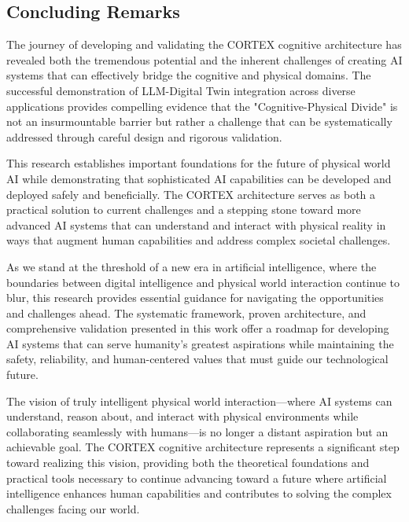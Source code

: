 \subsection{Concluding Remarks}

The journey of developing and validating the CORTEX cognitive architecture has revealed both the tremendous potential and the inherent challenges of creating AI systems that can effectively bridge the cognitive and physical domains. The successful demonstration of LLM-Digital Twin integration across diverse applications provides compelling evidence that the "Cognitive-Physical Divide" is not an insurmountable barrier but rather a challenge that can be systematically addressed through careful design and rigorous validation.

This research establishes important foundations for the future of physical world AI while demonstrating that sophisticated AI capabilities can be developed and deployed safely and beneficially. The CORTEX architecture serves as both a practical solution to current challenges and a stepping stone toward more advanced AI systems that can understand and interact with physical reality in ways that augment human capabilities and address complex societal challenges.

As we stand at the threshold of a new era in artificial intelligence, where the boundaries between digital intelligence and physical world interaction continue to blur, this research provides essential guidance for navigating the opportunities and challenges ahead. The systematic framework, proven architecture, and comprehensive validation presented in this work offer a roadmap for developing AI systems that can serve humanity's greatest aspirations while maintaining the safety, reliability, and human-centered values that must guide our technological future.

The vision of truly intelligent physical world interaction—where AI systems can understand, reason about, and interact with physical environments while collaborating seamlessly with humans—is no longer a distant aspiration but an achievable goal. The CORTEX cognitive architecture represents a significant step toward realizing this vision, providing both the theoretical foundations and practical tools necessary to continue advancing toward a future where artificial intelligence enhances human capabilities and contributes to solving the complex challenges facing our world.

